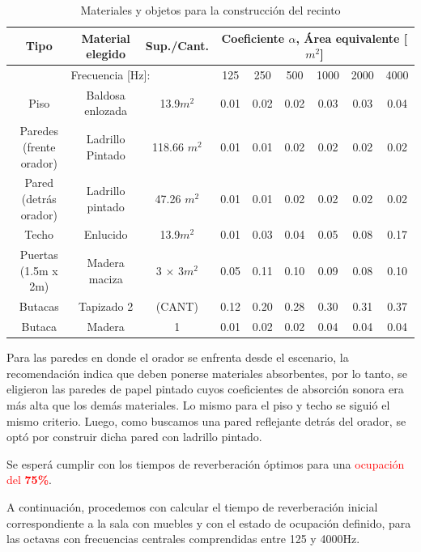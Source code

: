 \begin{table}[h]
    \centering
    \begin{tabular}{|c|c|c||c|c|c|c|c|c|} \hline
        Tipo &  Material elegido &Sup./Cant. & \multicolumn{6}{|c|}{Coeficiente $\alpha$, Área equivalente [$m^2$]} \\ \hline
        \multicolumn{3}{|c|}{Frecuencia [Hz]:} & 125 & 250 & 500 & 1000 & 2000 & 4000 \\ \hline \hline
        Piso & Baldosa enlozada & 13.9$m^2$ & 0.01 & 0.02 & 0.02 & 0.03 & 0.03 & 0.04 \\ \hline
        Paredes (frente orador) & Ladrillo Pintado & 118.66 $m^2$ & 0.01 & 0.01 & 0.02 & 0.02 & 0.02 & 0.02 \\ \hline
        Pared (detrás orador) & Ladrillo pintado & 47.26 $m^2$ & 0.01 & 0.01 & 0.02 & 0.02 & 0.02 & 0.02 \\ \hline
        Techo & Enlucido &13.9$m^2$ & 0.01 & 0.03 & 0.04 & 0.05 & 0.08 & 0.17 \\ \hline
        Puertas (1.5m x 2m) & Madera maciza & 3 $\times$ 3$m^2$ & 0.05 & 0.11 & 0.10 & 0.09 & 0.08 &  0.10 \\ \hline \hline
        Butacas & Tapizado 2 & (CANT) & 0.12 & 0.20 & 0.28 & 0.30 & 0.31 & 0.37 \\ \hline
        Butaca & Madera & 1 & 0.01 & 0.02 & 0.02 & 0.04 & 0.04 & 0.04 \\ \hline
    \end{tabular}
    \caption{Materiales y objetos para la construcción del recinto}
    \label{tab:materiales_construccion_recinto}
\end{table}

\par Para las paredes en donde el orador se enfrenta desde el escenario, la recomendación indica que deben ponerse materiales absorbentes, por lo tanto, se eligieron las paredes de papel pintado cuyos coeficientes de absorción sonora era más alta que los demás materiales. Lo mismo para el piso y techo se siguió el mismo criterio. Luego, como buscamos una pared reflejante detrás del orador, se optó por construir dicha pared con ladrillo pintado.

\par Se esperá cumplir con los tiempos de reverberación óptimos para una  \textcolor{red}{ocupación del \textbf{75\%}}.\\

\par A continuación, procedemos con calcular el tiempo de reverberación inicial correspondiente a la sala con muebles y con el estado de ocupación definido, para las octavas con frecuencias centrales comprendidas entre 125 y 4000Hz.


